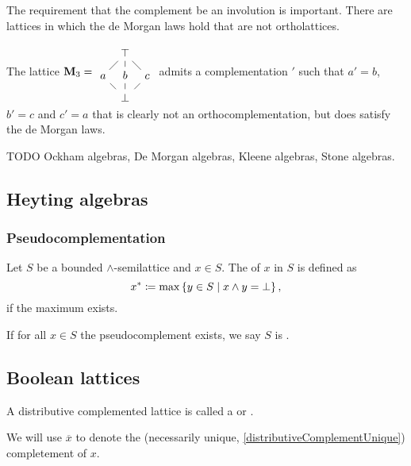 The requirement that the complement be an involution is important. There are lattices in which the de Morgan laws hold that are not ortholattices.

\begin{example}
The lattice $\mathbf{M}_3 = \begin{tikzcd}[column sep={2em,between origins},row sep={2em,between origins}]
&\top \ar[ld, dash] \ar[d,dash] \ar[rd, dash] &\\ a \ar[rd, dash]& b \ar[d, dash] & c \ar[ld, dash] \\ &\bot &
\end{tikzcd}$ admits a complementation $'$ such that $a' = b$, $b' = c$ and $c' = a$ that is clearly not an orthocomplementation, but does satisfy the de Morgan laws.
\end{example}

TODO Ockham algebras, De Morgan algebras, Kleene algebras, Stone algebras.

\subsection{Heyting algebras}
\subsubsection{Pseudocomplementation}
\begin{definition}
Let $S$ be a bounded $\wedge$-semilattice and $x\in S$. The  of $x$ in $S$ is defined as
\[ x^* \coloneqq \max\left\{ y\in S \;\middle|\; x\wedge y = \bot \right\}, \]
if the maximum exists.

If for all $x\in S$ the pseudocomplement exists, we say $S$ is .
\end{definition}

\begin{lemma}

\end{lemma}

\subsection{Boolean lattices}
\begin{definition}
A distributive complemented lattice is called a  or .
\end{definition}
We will use $\overline{x}$ to denote the (necessarily unique, \ref{distributiveComplementUnique}) completement of $x$.

